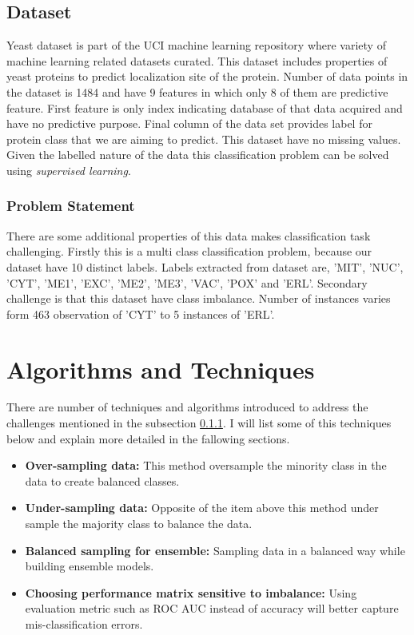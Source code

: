 \documentclass[12pt]{article}
\begin{document}
\subsection{Dataset} \label{subsec:data}

Yeast dataset is part of the UCI machine learning repository where variety of machine learning related datasets curated. This dataset includes properties of yeast proteins to predict localization site of the protein. Number of data points in the dataset is 1484 and have 9 features in which only 8 of them are predictive feature. First feature is only index indicating database of that data acquired and have no predictive purpose. Final column of the data set provides label for protein class that we are aiming to predict. This dataset have no missing values. Given the labelled nature of the data this classification problem can be solved using \textit{supervised learning}.

\subsubsection{Problem Statement} \label{subsec:problem}

There are some additional properties of this data makes classification task challenging. Firstly this is a multi class classification problem, because our dataset have 10 distinct labels. Labels extracted from dataset are, 'MIT', 'NUC', 'CYT', 'ME1', 'EXC', 'ME2', 'ME3', 'VAC', 'POX' and 'ERL'. Secondary challenge is that this dataset have class imbalance. Number of instances varies form 463 observation of 'CYT' to 5 instances of 'ERL'.

\section{Algorithms and Techniques} \label{sec:algo}

There are number of techniques and algorithms introduced to address the challenges mentioned in the subsection \ref{subsec:problem}. I will list some of this techniques below and explain more detailed in the fallowing sections.

\begin{itemize}
    \item \textbf{Over-sampling data: }This method oversample the minority class in the data to create balanced classes.
    \item \textbf{Under-sampling data: }Opposite of the item above this method under sample the majority class to balance the data.
    \item \textbf{Balanced sampling for ensemble: }Sampling data in a balanced way while building ensemble models.
    \item \textbf{Choosing performance matrix sensitive to imbalance: }Using evaluation metric such as ROC AUC instead of accuracy will better capture mis-classification errors.
\end{itemize}
\end{document}
